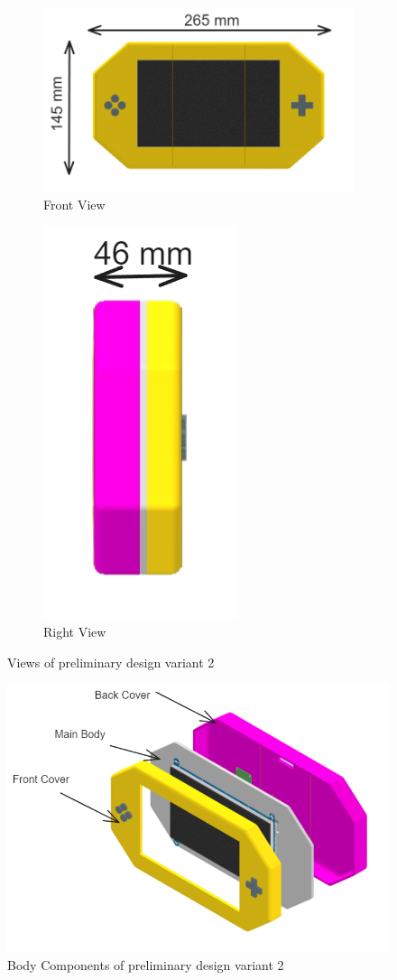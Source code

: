 \begin{figure}[h!]
    \centering
    \begin{subfigure}[c]{0.65\textwidth}
        \begin{minipage}{\textwidth}
            \centering
            \includegraphics[height=4 cm]{texs/Part1/chapter4/image/v22.png}
        \end{minipage}
        \caption{Front View}
        \label{fig:variant2_front_view}
    \end{subfigure}
    \begin{subfigure}[c]{0.25\textwidth}
        \begin{minipage}{\textwidth}
            \centering
            \includegraphics[height=4 cm]{texs/Part1/chapter4/image/v23.png}
        \end{minipage}
        \caption{Right View}
        \label{fig:variant2_right_view}
    \end{subfigure}
    \caption{Views of preliminary design variant 2}
    \label{fig:variant2_views}
\end{figure}

\begin{figure}[h!]
    \centering
    \includegraphics[width=0.5\linewidth]{texs/Part1/chapter4/image/v24.png}
    \caption{Body Components of preliminary design variant 2}
    \label{fig:variant2_body_components}
\end{figure}

